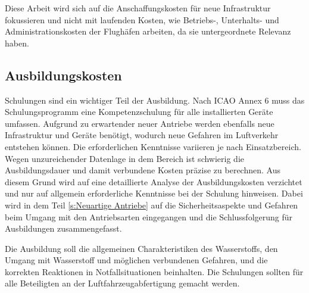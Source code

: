 Diese Arbeit wird sich auf die Anschaffungskosten für neue Infrastruktur fokussieren und nicht mit 
laufenden Kosten, wie Betriebs-, Unterhalts- und Administrationskosten der Flughäfen arbeiten, 
da sie untergeordnete Relevanz haben.

\subsection{Ausbildungskosten}

Schulungen sind ein wichtiger Teil der Ausbildung. 
Nach ICAO Annex 6 muss das Schulungsprogramm eine Kompetenzschulung für alle installierten Geräte umfassen.
Aufgrund zu erwartender neuer Antriebe werden ebenfalls neue Infrastruktur und Geräte benötigt, 
wodurch neue Gefahren im Luftverkehr entstehen können. %
Die erforderlichen Kenntnisse variieren je nach Einsatzbereich.
%
Wegen unzureichender Datenlage in dem Bereich ist schwierig die 
Ausbildungsdauer und damit verbundene Kosten präzise zu berechnen.
Aus diesem Grund wird auf eine detaillierte Analyse der Ausbildungskosten verzichtet 
und nur auf allgemein erforderliche Kenntnisse bei der Schulung hinweisen.
Dabei wird in dem Teil \ref{s:Neuartige Antriebe} auf die Sicherheitsaspekte und Gefahren 
beim Umgang mit den Antriebsarten eingegangen und %
die Schlussfolgerung für Ausbildungen zusammengefasst. %

Die Ausbildung soll die allgemeinen Charakteristiken des Wasserstoffs, 
den Umgang mit Wasserstoff und möglichen verbundenen Gefahren, 
und die korrekten Reaktionen in Notfallsituationen beinhalten. %
Die Schulungen sollten für alle Beteiligten an der Luftfahrzeugabfertigung gemacht werden.

